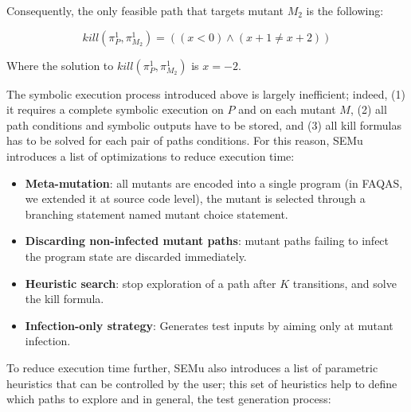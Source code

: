 Consequently, the only feasible path that targets mutant $M_2$ is the following:

\begin{equation}
	kill(\pi_{P}^{1}, \pi_{M_2}^{1}) = ((x < 0) \wedge (x + 1 \neq x + 2) )
\end{equation}

Where the solution to $kill(\pi_{P}^{1}, \pi_{M_2}^{1})$ is $x = -2$.

The symbolic execution process introduced above is largely inefficient; indeed,
(1) it requires a complete symbolic execution on $P$ and on each mutant $M$, (2) all path conditions and symbolic outputs have to be stored, and (3) all kill formulas has to be solved for each pair of paths conditions. 
For this reason, SEMu introduces a list of optimizations to reduce execution time:

\begin{itemize}
	\item \textbf{Meta-mutation}: all mutants are encoded into a single program (in FAQAS, we extended it at source code level), the mutant is selected through a branching statement named mutant choice statement.
	\item \textbf{Discarding non-infected mutant paths}: mutant paths failing to infect the program state are discarded immediately.
	\item \textbf{Heuristic search}: stop exploration of a path after $K$ transitions, and solve the kill formula.
	\item \textbf{Infection-only strategy}: Generates test inputs by aiming only at mutant infection.
\end{itemize}

To reduce execution time further, SEMu also introduces a list of parametric heuristics that can be controlled by the user; this set of heuristics help to define which paths to explore and in general, the test generation process:


